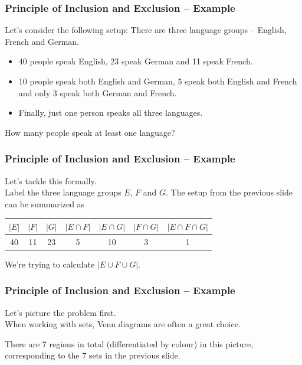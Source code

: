 \documentclass[aspectratio=169,11pt,usenames,dvipsnames]{beamer}
\begin{document}
\begin{frame}
 \frametitle{Principle of Inclusion and Exclusion -- Example}
 Let's consider the following setup: There are three language groups -- English,
 French and German.\pause
 \begin{itemize}
  \item 40 people speak English, 23 speak German and 11 speak French.\pause
  \item 10 people speak both English and German, 5 speak both English and French
   and only 3 speak both German and French.\pause
  \item Finally, just one person speaks all three languages.
 \end{itemize}
 \pause
 How many people speak at least one language?
\end{frame}

\begin{frame}
 \frametitle{Principle of Inclusion and Exclusion -- Example}
 Let's tackle this formally.\pause\\
 Label the three language groups $E$, $F$ and $G$. The setup from the previous
 slide can be summarized as
 \begin{center}
  \begin{tabular}{ccccccc}
   $|E|$ & $|F|$ & $|G|$ & $|E \cap F|$ & $|E \cap G|$ & $|F \cap G|$ & $|E \cap
   F \cap G|$\\
   \midrule
   40 & 11 & 23 & 5 & 10 & 3 & 1
  \end{tabular}
 \end{center}
 \pause
 We're trying to calculate $|E \cup F \cup G|$.
\end{frame}

\begin{frame}
 \frametitle{Principle of Inclusion and Exclusion -- Example}
 Let's picture the problem first.\pause\\
 When working with sets, Venn diagrams are often a great choice.
 \begin{center}
 \end{center}
 \pause
 There are 7 regions in total (differentiated by colour) in this picture,
 corresponding to the 7 sets in the previous slide.
\end{frame}
\end{document}
